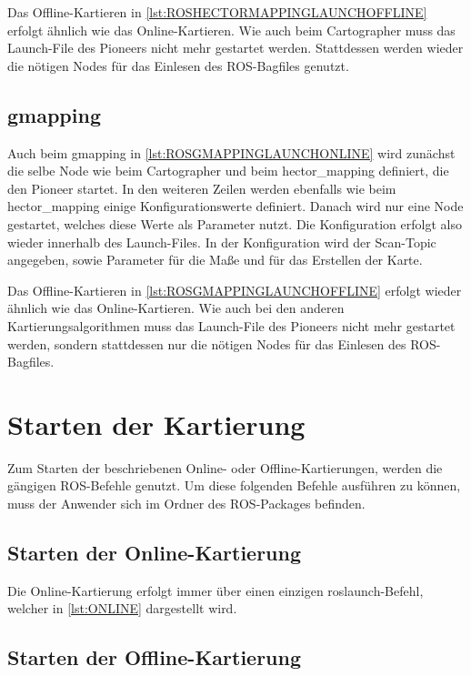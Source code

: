 Das Offline-Kartieren in \autoref{lst:ROSHECTORMAPPINGLAUNCHOFFLINE} erfolgt ähnlich wie das Online-Kartieren. Wie auch beim Cartographer muss das Launch-File des Pioneers nicht mehr gestartet werden. Stattdessen werden wieder die nötigen Nodes für das Einlesen des \ac{ROS}-Bagfiles genutzt.

\subsection{gmapping}

Auch beim gmapping in \autoref{lst:ROSGMAPPINGLAUNCHONLINE} wird zunächst die selbe Node wie beim Cartographer und beim hector\_mapping definiert, die den Pioneer startet. In den weiteren Zeilen werden ebenfalls wie beim hector\_mapping einige Konfigurationswerte definiert. Danach wird nur eine Node gestartet, welches diese Werte als Parameter nutzt. Die Konfiguration erfolgt also wieder innerhalb des Launch-Files. In der Konfiguration wird der Scan-Topic angegeben, sowie Parameter für die Maße und für das Erstellen der Karte.

Das Offline-Kartieren in \autoref{lst:ROSGMAPPINGLAUNCHOFFLINE} erfolgt wieder ähnlich wie das Online-Kartieren. Wie auch bei den anderen Kartierungsalgorithmen muss das Launch-File des Pioneers nicht mehr gestartet werden, sondern stattdessen nur die nötigen Nodes für das Einlesen des \ac{ROS}-Bagfiles.

\section{Starten der Kartierung}

Zum Starten der beschriebenen Online- oder Offline-Kartierungen, werden die gängigen \ac{ROS}-Befehle genutzt. Um diese folgenden Befehle ausführen zu können, muss der Anwender sich im Ordner des \ac{ROS}-Packages befinden.

\subsection{Starten der Online-Kartierung}

Die Online-Kartierung erfolgt immer über einen einzigen roslaunch-Befehl, welcher in \autoref{lst:ONLINE} dargestellt wird.



\subsection{Starten der Offline-Kartierung}

